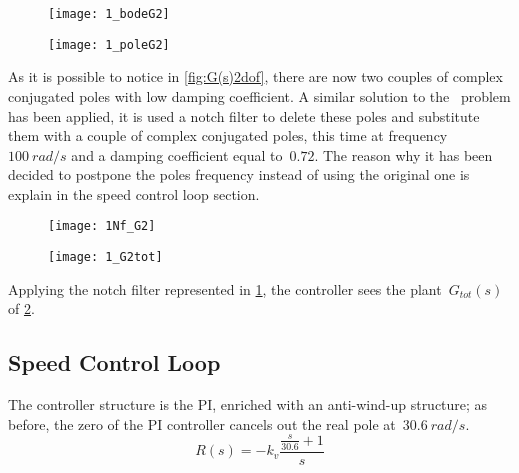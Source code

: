 \begin{figure*}[h]
	\centering
	\begin{subfigure}{0.4\columnwidth}
		\texttt{[image: 1\_bodeG2]}
	\end{subfigure}
	\begin{subfigure}{0.4\columnwidth}
		\texttt{[image: 1\_poleG2]}
	\end{subfigure}
	\caption{G(s)}
	\label{fig:G(s)2dof}
\end{figure*}

As it is possible to notice in \cref{fig:G(s)2dof}, there are now two couples of complex conjugated poles with low damping coefficient. A similar solution to the \onedof\ problem has been applied, it is used a notch filter to delete these poles and substitute them with a couple of complex conjugated poles, this time at frequency~$100\ rad/s$ and a damping coefficient equal to~$0.72$. The reason why it has been decided to postpone the poles frequency instead of using the original one is explain in the speed control loop section.


\begin{figure*}[h]
	\centering
	\begin{subfigure}{0.45\columnwidth}
		\texttt{[image: 1Nf\_G2]}
		\label{fig:Notch Filter2}
	\end{subfigure}
	\begin{subfigure}{0.45\columnwidth}
		\texttt{[image: 1\_G2tot]}
		\label{fig:Plant G(s) with Notch Filter2}
	\end{subfigure}
	\caption{Plant $G(s)$ with Notch Filter $N_f(s)$: $G_{tot}$(s)}
\end{figure*}


Applying the notch filter represented in \cref{fig:Notch Filter2}, the controller sees the plant~$G_{tot}(s)$ of \cref{fig:Plant G(s) with Notch Filter2}.

\newpage 
\subsection{Speed Control Loop}
The controller structure is the PI, enriched with an anti-wind-up structure; as before, the zero of the PI controller cancels out the real pole at~$30.6\ rad/s$.
\[
R(s)=-k_v
\frac{\frac{s}{30.6}+1}{s}
\]

